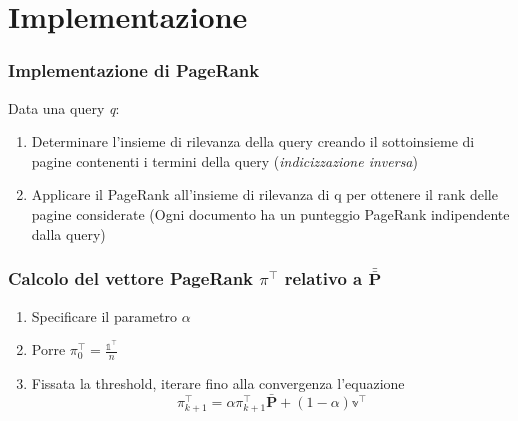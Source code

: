 \documentclass{beamer}
\begin{document}
\section{Implementazione}
\begin{frame}
	\frametitle{Implementazione di PageRank}
	Data una query \emph{q}:
	\begin{enumerate}
		\item Determinare l'insieme di rilevanza della query creando il sottoinsieme di pagine contenenti i termini della query (\emph{indicizzazione inversa})
		\item Applicare il PageRank all'insieme di rilevanza di q per ottenere il rank delle pagine considerate (Ogni documento ha un punteggio PageRank indipendente dalla query)
	\end{enumerate}
\end{frame}
\begin{frame}
	\frametitle{Calcolo del vettore PageRank $\pi^\intercal$ relativo a $\bar{\bar{\textbf{P}}}$}
	\begin{enumerate}
		\item Specificare il parametro $\alpha$
		\item Porre $\pi_0^\intercal=\frac{\mathbb{1}^\intercal}{n}$
		\item Fissata la threshold, iterare fino alla convergenza l'equazione $$\pi_{k+1}^\intercal = \alpha \pi_{k+1}^\intercal \bar{\textbf{P}} + (1- \alpha) \mathbb{v}^\intercal  $$
	\end{enumerate}
\end{frame}
\end{document}
